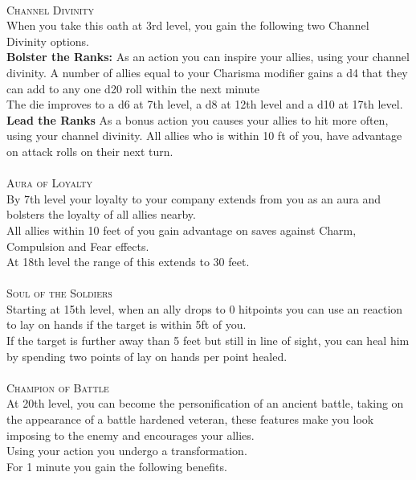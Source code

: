 \documentclass[22pt,a4paper,twocolumn]{article}
\begin{document}
\\
{\fontsize{18pt}{18pt}\textcolor{title}{\textsc{Channel Divinity}}}\\
When you take this oath at 3rd level, you gain the following two Channel Divinity options.\\
\indent\textbf{Bolster the Ranks:} As an action you can inspire your allies, using your channel divinity. A number of allies equal to your Charisma modifier gains a d4 that they can add to any one d20 roll within the next minute\\
\indent The die improves to a d6 at 7th level, a d8 at 12th level and a d10 at 17th level.\\
\indent\textbf{Lead the Ranks} As a bonus action you causes your allies to hit more often, using your channel divinity. All allies who is within 10 ft of you, have advantage on attack rolls on their next turn.\\
\vspace{26pt}
\\
{\fontsize{18pt}{18pt}\textsc{\textcolor{title}{Aura of Loyalty}}}\\
By 7th level your loyalty to your company extends from you as an aura and bolsters the loyalty of all allies nearby.\\
\indent All allies within 10 feet of you gain advantage on saves against Charm, Compulsion and Fear effects.\\
\indent At 18th level the range of this extends to 30 feet.\\
\\
{\fontsize{18pt}{18pt}\textsc{\textcolor{title}{Soul of the Soldiers}}}\\
Starting at 15th level, when an ally drops to 0 hitpoints you can use an reaction to lay on hands if the target is within 5ft of you.\\
\indent If the target is further away than 5 feet but still in line of sight, you can heal him by spending two points of lay on hands per point healed.\\
\\
{\fontsize{18pt}{18pt}\textsc{\textcolor{title}{Champion of Battle}}}\\
At 20th level, you can become the personification of an ancient battle, taking on the appearance of a battle hardened veteran, these features make you look imposing to the enemy and encourages your allies.\\
\indent Using your action you undergo a transformation.\\
For 1 minute you gain the following benefits.
\end{document}

